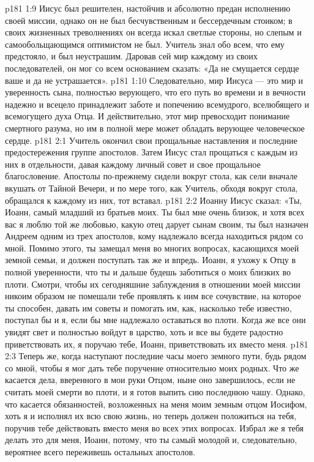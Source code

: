 \vs p181 1:9 Иисус был решителен, настойчив и абсолютно предан исполнению своей миссии, однако он не был бесчувственным и бессердечным стоиком; в своих жизненных треволнениях он всегда искал светлые стороны, но слепым и самообольщающимся оптимистом не был. Учитель знал обо всем, что ему предстояло, и был неустрашим. Даровав сей мир каждому из своих последователей, он мог со всем основанием сказать: «Да не смущается сердце ваше и да не устрашается».
\vs p181 1:10 Следовательно, мир Иисуса --- это мир и уверенность сына, полностью верующего, что его путь во времени и в вечности надежно и всецело принадлежит заботе и попечению всемудрого, вселюбящего и всемогущего духа Отца. И действительно, этот мир превосходит понимание смертного разума, но им в полной мере может обладать верующее человеческое сердце.
\vs p181 2:1 Учитель окончил свои прощальные наставления и последние предостережения группе апостолов. Затем Иисус стал прощаться с каждым из них в отдельности, давая каждому личный совет и свое прощальное благословение. Апостолы по\hyp{}прежнему сидели вокруг стола, как сели вначале вкушать от Тайной Вечери, и по мере того, как Учитель, обходя вокруг стола, обращался к каждому из них, тот вставал.
\vs p181 2:2 \pc Иоанну Иисус сказал: «Ты, Иоанн, самый младший из братьев моих. Ты был мне очень близок, и хотя всех вас я люблю той же любовью, какую отец дарует сынам своим, ты был назначен Андреем одним из трех апостолов, кому надлежало всегда находиться рядом со мной. Помимо этого, ты замещал меня во многих вопросах, касающихся моей земной семьи, и должен поступать так же и впредь. Иоанн, я ухожу к Отцу в полной уверенности, что ты и дальше будешь заботиться о моих близких во плоти. Смотри, чтобы их сегодняшние заблуждения в отношении моей миссии никоим образом не помешали тебе проявлять к ним все сочувствие, на которое ты способен, давать им советы и помогать им, как, насколько тебе известно, поступал бы и я, если бы мне надлежало оставаться во плоти. Когда же все они увидят свет и полностью войдут в царство, хоть и все вы будете радостно приветствовать их, я поручаю тебе, Иоанн, приветствовать их вместо меня.
\vs p181 2:3 Теперь же, когда наступают последние часы моего земного пути, будь рядом со мной, чтобы я мог дать тебе поручение относительно моих родных. Что же касается дела, вверенного в мои руки Отцом, ныне оно завершилось, если не считать моей смерти во плоти, и я готов выпить сию последнюю чашу. Однако, что касается обязанностей, возложенных на меня моим земным отцом Иосифом, хоть я и исполнял их всю свою жизнь, но теперь должен положиться на тебя, поручив тебе действовать вместо меня во всех этих вопросах. Избрал же я тебя делать это для меня, Иоанн, потому, что ты самый молодой и, следовательно, вероятнее всего переживешь остальных апостолов.
